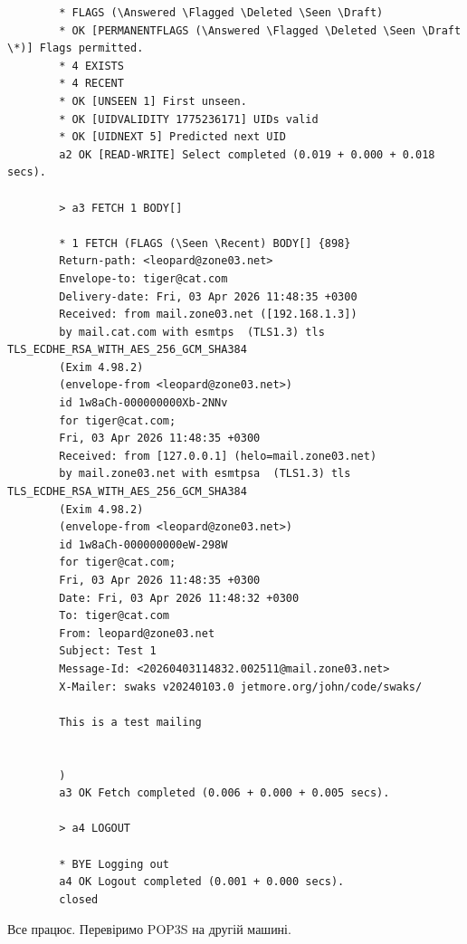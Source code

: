 \documentclass[14pt, a4paper]{extreport}
\begin{document}
\begin{verbatim}
		* FLAGS (\Answered \Flagged \Deleted \Seen \Draft)
		* OK [PERMANENTFLAGS (\Answered \Flagged \Deleted \Seen \Draft \*)] Flags permitted.
		* 4 EXISTS
		* 4 RECENT
		* OK [UNSEEN 1] First unseen.
		* OK [UIDVALIDITY 1775236171] UIDs valid
		* OK [UIDNEXT 5] Predicted next UID
		a2 OK [READ-WRITE] Select completed (0.019 + 0.000 + 0.018 secs).
		
		> a3 FETCH 1 BODY[]
		
		* 1 FETCH (FLAGS (\Seen \Recent) BODY[] {898}
		Return-path: <leopard@zone03.net>
		Envelope-to: tiger@cat.com
		Delivery-date: Fri, 03 Apr 2026 11:48:35 +0300
		Received: from mail.zone03.net ([192.168.1.3])
		by mail.cat.com with esmtps  (TLS1.3) tls TLS_ECDHE_RSA_WITH_AES_256_GCM_SHA384
		(Exim 4.98.2)
		(envelope-from <leopard@zone03.net>)
		id 1w8aCh-000000000Xb-2NNv
		for tiger@cat.com;
		Fri, 03 Apr 2026 11:48:35 +0300
		Received: from [127.0.0.1] (helo=mail.zone03.net)
		by mail.zone03.net with esmtpsa  (TLS1.3) tls TLS_ECDHE_RSA_WITH_AES_256_GCM_SHA384
		(Exim 4.98.2)
		(envelope-from <leopard@zone03.net>)
		id 1w8aCh-000000000eW-298W
		for tiger@cat.com;
		Fri, 03 Apr 2026 11:48:35 +0300
		Date: Fri, 03 Apr 2026 11:48:32 +0300
		To: tiger@cat.com
		From: leopard@zone03.net
		Subject: Test 1
		Message-Id: <20260403114832.002511@mail.zone03.net>
		X-Mailer: swaks v20240103.0 jetmore.org/john/code/swaks/
		
		This is a test mailing
		
		
		)
		a3 OK Fetch completed (0.006 + 0.000 + 0.005 secs).
		
		> a4 LOGOUT
		
		* BYE Logging out
		a4 OK Logout completed (0.001 + 0.000 secs).
		closed
	\end{verbatim}
	
	Все працює. Перевіримо POP3S на другій машині.
	
\end{document}
